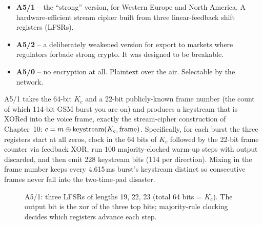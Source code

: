 \begin{itemize}
  \item \textbf{A5/1} -- the ``strong'' version, for Western Europe and North America. A hardware-efficient stream cipher built from three linear-feedback shift registers (LFSRs).
  \item \textbf{A5/2} -- a deliberately weakened version for export to markets where regulators forbade strong crypto. It was designed to be breakable.
  \item \textbf{A5/0} -- no encryption at all. Plaintext over the air. Selectable by the network.
\end{itemize}

A5/1 takes the 64-bit $K_c$ and a 22-bit publicly-known frame number (the count of which 114-bit GSM burst you are on) and produces a keystream that is XORed into the voice frame, exactly the stream-cipher construction of Chapter~10: $c = m \oplus \text{keystream}(K_c, \text{frame})$. Specifically, for each burst the three registers start at all zeros, clock in the 64 bits of $K_c$ followed by the 22-bit frame counter via feedback XOR, run 100 majority-clocked warm-up steps with output discarded, and then emit 228 keystream bits (114 per direction). Mixing in the frame number keeps every 4.615\,ms burst's keystream distinct so consecutive frames never fall into the two-time-pad disaster.

\begin{figure}[H]
\centering
{}
\caption{A5/1: three LFSRs of lengths 19, 22, 23 (total 64 bits = $K_c$). The output bit is the xor of the three top bits; majority-rule clocking decides which registers advance each step.}
\label{ch29:fig-a51}
\end{figure}

